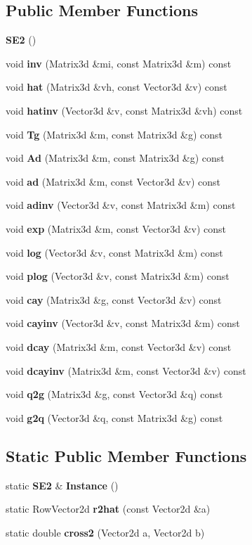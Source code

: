 \subsection*{\-Public \-Member \-Functions}
\begin{DoxyCompactItemize}
\item 
{\bf \-S\-E2} ()
\item 
void {\bf inv} (\-Matrix3d \&mi, const \-Matrix3d \&m) const 
\item 
void {\bf hat} (\-Matrix3d \&vh, const \-Vector3d \&v) const 
\item 
void {\bf hatinv} (\-Vector3d \&v, const \-Matrix3d \&vh) const 
\item 
void {\bf \-Tg} (\-Matrix3d \&m, const \-Matrix3d \&g) const 
\item 
void {\bf \-Ad} (\-Matrix3d \&m, const \-Matrix3d \&g) const 
\item 
void {\bf ad} (\-Matrix3d \&m, const \-Vector3d \&v) const 
\item 
void {\bf adinv} (\-Vector3d \&v, const \-Matrix3d \&m) const 
\item 
void {\bf exp} (\-Matrix3d \&m, const \-Vector3d \&v) const 
\item 
void {\bf log} (\-Vector3d \&v, const \-Matrix3d \&m) const 
\item 
void {\bf plog} (\-Vector3d \&v, const \-Matrix3d \&m) const 
\item 
void {\bf cay} (\-Matrix3d \&g, const \-Vector3d \&v) const 
\item 
void {\bf cayinv} (\-Vector3d \&v, const \-Matrix3d \&m) const 
\item 
void {\bf dcay} (\-Matrix3d \&m, const \-Vector3d \&v) const 
\item 
void {\bf dcayinv} (\-Matrix3d \&m, const \-Vector3d \&v) const 
\item 
void {\bf q2g} (\-Matrix3d \&g, const \-Vector3d \&q) const 
\item 
void {\bf g2q} (\-Vector3d \&q, const \-Matrix3d \&g) const 
\end{DoxyCompactItemize}
\subsection*{\-Static \-Public \-Member \-Functions}
\begin{DoxyCompactItemize}
\item 
static {\bf \-S\-E2} \& {\bf \-Instance} ()
\item 
static \-Row\-Vector2d {\bf r2hat} (const \-Vector2d \&a)
\item 
static double {\bf cross2} (\-Vector2d a, \-Vector2d b)
\end{DoxyCompactItemize}

